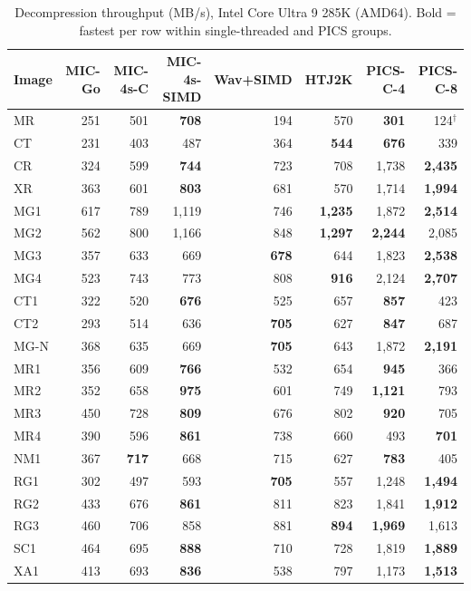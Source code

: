 \documentclass[journal]{IEEEtran}
\begin{document}
\begin{table}[t]
\centering
\caption{Decompression throughput (MB/s), Intel Core Ultra 9 285K (AMD64).
Bold = fastest per row within single-threaded and PICS groups.}
\label{tab:decomp-amd64}
\scriptsize
\begin{tabular}{lrrrrrrr}
\toprule
Image & MIC-Go & MIC-4s-C & MIC-4s-SIMD & Wav+SIMD & HTJ2K & PICS-C-4 & PICS-C-8 \\
\midrule
MR   & 251 & 501 & \textbf{708} & 194 & 570 & \textbf{301} & 124$^\dagger$ \\
CT   & 231 & 403 & 487 & 364 & \textbf{544} & \textbf{676} & 339 \\
CR   & 324 & 599 & \textbf{744} & 723 & 708 & 1,738 & \textbf{2,435} \\
XR   & 363 & 601 & \textbf{803} & 681 & 570 & 1,714 & \textbf{1,994} \\
MG1  & 617 & 789 & 1,119 & 746 & \textbf{1,235} & 1,872 & \textbf{2,514} \\
MG2  & 562 & 800 & 1,166 & 848 & \textbf{1,297} & \textbf{2,244} & 2,085 \\
MG3  & 357 & 633 & 669 & \textbf{678} & 644 & 1,823 & \textbf{2,538} \\
MG4  & 523 & 743 & 773 & 808 & \textbf{916} & 2,124 & \textbf{2,707} \\
CT1  & 322 & 520 & \textbf{676} & 525 & 657 & \textbf{857} & 423 \\
CT2  & 293 & 514 & 636 & \textbf{705} & 627 & \textbf{847} & 687 \\
MG-N & 368 & 635 & 669 & \textbf{705} & 643 & 1,872 & \textbf{2,191} \\
MR1  & 356 & 609 & \textbf{766} & 532 & 654 & \textbf{945} & 366 \\
MR2  & 352 & 658 & \textbf{975} & 601 & 749 & \textbf{1,121} & 793 \\
MR3  & 450 & 728 & \textbf{809} & 676 & 802 & \textbf{920} & 705 \\
MR4  & 390 & 596 & \textbf{861} & 738 & 660 & 493 & \textbf{701} \\
NM1  & 367 & \textbf{717} & 668 & 715 & 627 & \textbf{783} & 405 \\
RG1  & 302 & 497 & 593 & \textbf{705} & 557 & 1,248 & \textbf{1,494} \\
RG2  & 433 & 676 & \textbf{861} & 811 & 823 & 1,841 & \textbf{1,912} \\
RG3  & 460 & 706 & 858 & 881 & \textbf{894} & \textbf{1,969} & 1,613 \\
SC1  & 464 & 695 & \textbf{888} & 710 & 728 & 1,819 & \textbf{1,889} \\
XA1  & 413 & 693 & \textbf{836} & 538 & 797 & 1,173 & \textbf{1,513} \\
\bottomrule
\end{tabular}
\end{table}
\end{document}
